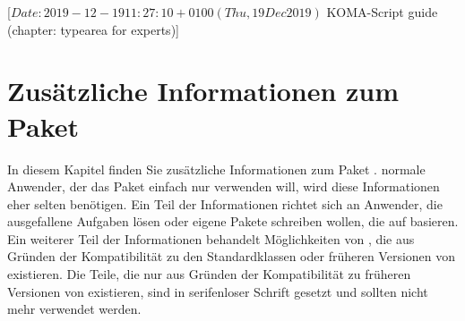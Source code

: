 %
%
%
%
%
%
%
%
% 
%
%
%
%

                 [$Date: 2019-12-19 11:27:10 +0100 (Thu, 19 Dec 2019) $
                  KOMA-Script guide (chapter: typearea for experts)]

\chapter{Zusätzliche Informationen zum Paket }

\BeginIndexGroup {} In diesem Kapitel finden Sie
zusätzliche Informationen zum Paket
\hyperref[cha:typearea]{}.  normale Anwender, der das Paket
einfach nur verwenden will, wird diese Informationen eher selten
benötigen. Ein Teil der Informationen richtet sich an Anwender, die
ausgefallene Aufgaben lösen oder eigene Pakete schreiben wollen, die auf
 basieren. Ein weiterer Teil der Informationen behandelt
Möglichkeiten von , die aus Gründen der Kompatibilität zu
den Standardklassen oder früheren Versionen von \KOMAScript{} existieren. Die
Teile, die nur aus Gründen der Kompatibilität zu früheren Versionen von
\KOMAScript{} existieren, sind in serifenloser Schrift gesetzt und sollten
nicht mehr verwendet werden.


